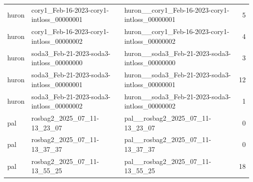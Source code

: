 \begin{table}[tbp]
\begin{tabular}{lllr}
huron & cory1\_Feb-16-2023-cory1-intloss\_00000001 & huron\_\_cory1\_Feb-16-2023-cory1-intloss\_00000001 & 5 \\
huron & cory1\_Feb-16-2023-cory1-intloss\_00000002 & huron\_\_cory1\_Feb-16-2023-cory1-intloss\_00000002 & 4 \\
huron & soda3\_Feb-21-2023-soda3-intloss\_00000000 & huron\_\_soda3\_Feb-21-2023-soda3-intloss\_00000000 & 3 \\
huron & soda3\_Feb-21-2023-soda3-intloss\_00000001 & huron\_\_soda3\_Feb-21-2023-soda3-intloss\_00000001 & 12 \\
huron & soda3\_Feb-21-2023-soda3-intloss\_00000002 & huron\_\_soda3\_Feb-21-2023-soda3-intloss\_00000002 & 1 \\
pal & rosbag2\_2025\_07\_11-13\_23\_07 & pal\_\_rosbag2\_2025\_07\_11-13\_23\_07 & 0 \\
pal & rosbag2\_2025\_07\_11-13\_37\_37 & pal\_\_rosbag2\_2025\_07\_11-13\_37\_37 & 0 \\
pal & rosbag2\_2025\_07\_11-13\_55\_25 & pal\_\_rosbag2\_2025\_07\_11-13\_55\_25 & 18 \\
\bottomrule
\end{tabular}
\end{table}
